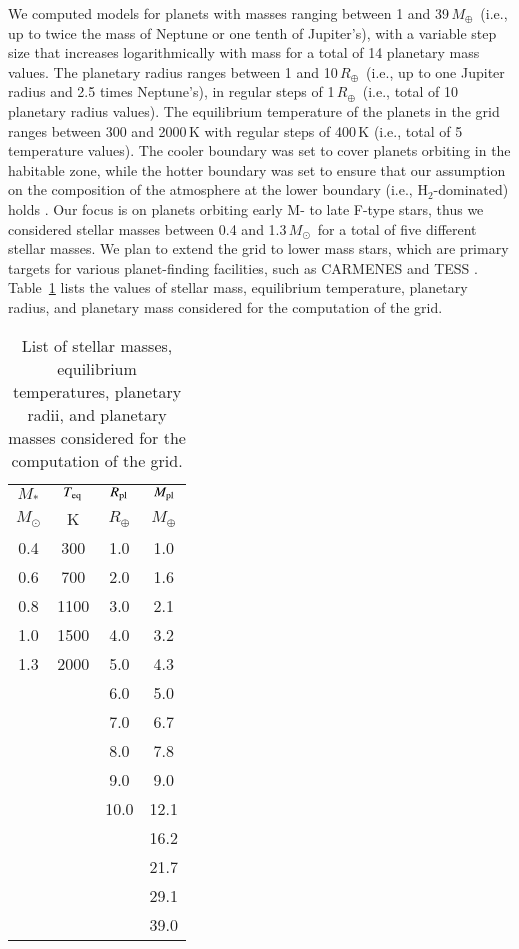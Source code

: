 \documentclass{aa}
\def\Teq{$T_{\rm eq}$}
\def\Rpl{$R_{\rm pl}$}
\def\Mpl{$M_{\rm pl}$}
\def\Re{\ensuremath{R_{\oplus}}}
\def\Me{\ensuremath{M_{\oplus}}}
\def\Mo{\ensuremath{M_{\odot}}}
\begin{document}
{We computed models for planets with masses ranging between 1 and
39\,\Me\  (i.e., up to twice the mass of Neptune or one tenth of
Jupiter's), with a variable step size that increases
logarithmically with mass for a total of 14 planetary mass values.
The planetary radius ranges between 1 and 10\,\Re\  (i.e., up to
one Jupiter radius and 2.5 times Neptune's), in regular steps of
1\,\Re\  (i.e., total of 10 planetary radius values). The
equilibrium temperature of the planets in the grid ranges between
300 and 2000\,K with regular steps of 400\,K (i.e., total of 5
temperature values).} The cooler boundary was set to cover planets
orbiting in the habitable zone, while the hotter boundary was set
to ensure that our assumption on the composition of the atmosphere
at the lower boundary (i.e., H$_2$-dominated) holds
\citep{koskinen2010}. {Our focus is on planets orbiting early M-
to late F-type stars, thus we considered stellar masses between
0.4 and 1.3\,\Mo\ for a total of five different stellar masses. We
plan to extend the grid to lower mass stars, which are primary
targets for various planet-finding facilities, such as CARMENES
\citep{carmenes} and TESS \citep{ricker2015}.
Table~\ref{tab:gridpar} lists the values of stellar mass,
equilibrium temperature, planetary radius, and planetary mass
considered for the computation of the grid.}
\begin{table}
\caption{{List of stellar masses, equilibrium temperatures,
planetary radii, and planetary masses considered for the
computation of the grid.}} \label{tab:gridpar}
\begin{center}
\begin{tabular}{c|c|c|c}
\hline
\hline
$M_*$ & \Teq & \Rpl & \Mpl \\
\Mo & K & \Re & \Me \\
\hline
0.4 & 300  & 1.0  & 1.0 \\
0.6 & 700  & 2.0  & 1.6 \\
0.8 & 1100 & 3.0  & 2.1 \\
1.0 & 1500 & 4.0  & 3.2 \\
1.3 & 2000 & 5.0  & 4.3 \\
    &      & 6.0  & 5.0 \\
    &      & 7.0  & 6.7 \\
    &      & 8.0  & 7.8 \\
    &      & 9.0  & 9.0 \\
    &      & 10.0 & 12.1 \\
    &      &      & 16.2 \\
    &      &      & 21.7 \\
    &      &      & 29.1 \\
    &      &      & 39.0 \\
\hline
\end{tabular}
\end{center}
\end{table}
\end{document}
